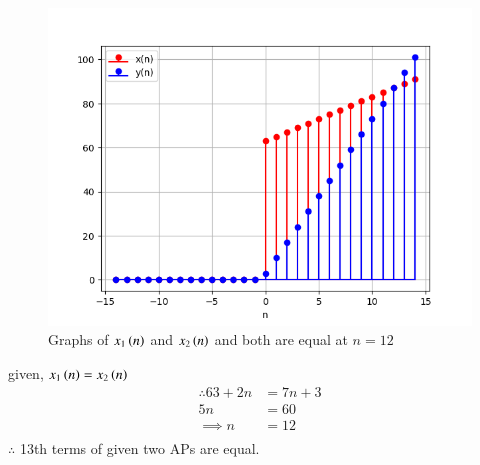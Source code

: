 \documentclass[journal,12pt,twocolumn]{IEEEtran}
\theoremstyle{remark}
\begin{document}
\begin{enumerate}
\begin{enumerate}
\begin{figure}[ht]
    \includegraphics[width = \linewidth]{Figure_1.png}
    \caption{Graphs of $ x_1\left(n\right)$ and $ x_2\left(n\right)$ and both are equal at $ n=12$}
    \label{Fig:1}
\end{figure}
given, $ x_1\left(n\right) = x_2\left(n\right)$\\
\begin{align}
\therefore 63 + 2n &= 7n+3\\
5n &= 60\\
\implies n &= 12\\
\end{align}
$ \therefore$ 13th terms of given two APs are equal.\\\\
\end{enumerate}
\end{enumerate}
\end{document}
